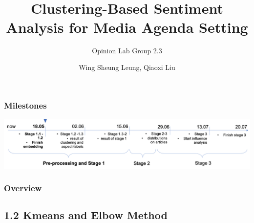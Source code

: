 \documentclass{tum-presentation}
\title[Shortened Title]{Clustering-Based Sentiment Analysis for Media Agenda Setting}
\subtitle{Opinion Lab Group 2.3}
\author{Wing Sheung Leung, Qiaoxi Liu}
\begin{document}
\begin{frame}[noframenumbering]
  \titlepage
\end{frame}
\begin{frame}
  \frametitle{Milestones}
  \vspace{2cm}
 \includegraphics[width = \textwidth]{figures/timeline.png}
  
\end{frame}
\begin{frame}[t]
  \frametitle{Overview}
  \tableofcontents[sectionstyle=show,subsectionstyle=show,subsubsectionstyle=shaded]
\end{frame}




\subsection{1.2 Kmeans and Elbow Method}
\end{document}
